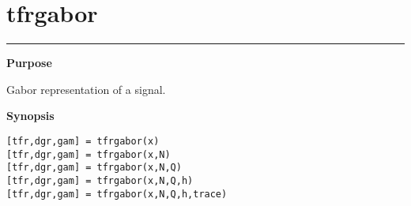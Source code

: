 

\section*{\hspace*{-1.6cm} tfrgabor}

\vspace*{-.4cm}
\hspace*{-1.6cm}\rule[0in]{16.5cm}{.02cm}
\vspace*{.2cm}

{\bf \large \sf Purpose}\\
\hspace*{1.5cm}
\begin{minipage}[t]{13.5cm}
Gabor representation of a signal.
\end{minipage}
\vspace*{.5cm}

{\bf \large \sf Synopsis}\\
\hspace*{1.5cm}
\begin{minipage}[t]{13.5cm}
\begin{verbatim}
[tfr,dgr,gam] = tfrgabor(x)
[tfr,dgr,gam] = tfrgabor(x,N)
[tfr,dgr,gam] = tfrgabor(x,N,Q)
[tfr,dgr,gam] = tfrgabor(x,N,Q,h)
[tfr,dgr,gam] = tfrgabor(x,N,Q,h,trace)
\end{verbatim}
\end{minipage}
\vspace*{.5cm}

